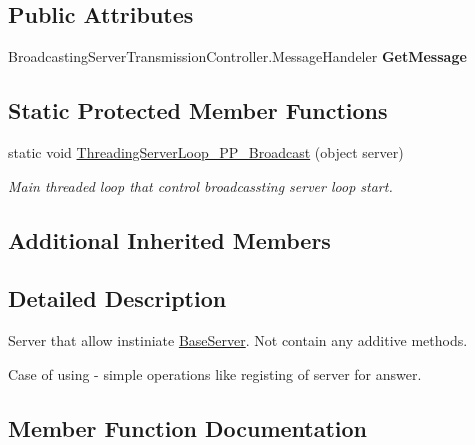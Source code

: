 \subsection*{Public Attributes}
\begin{DoxyCompactItemize}
\item 
\mbox{\label{class_uniform_server_1_1_standard_1_1_broadcasting_server_a0c09cadabd5e8c941979bc7b32185c79}} 
Broadcasting\+Server\+Transmission\+Controller.\+Message\+Handeler {\bfseries Get\+Message}
\end{DoxyCompactItemize}
\subsection*{Static Protected Member Functions}
\begin{DoxyCompactItemize}
\item 
static void \mbox{\hyperlink{class_uniform_server_1_1_standard_1_1_broadcasting_server_af0b6354f992b05477ddbbead9a3b2250}{Threading\+Server\+Loop\+\_\+\+P\+P\+\_\+\+Broadcast}} (object server)
\begin{DoxyCompactList}\small\item\em Main threaded loop that control broadcassting server loop start. \end{DoxyCompactList}\end{DoxyCompactItemize}
\subsection*{Additional Inherited Members}


\subsection{Detailed Description}
Server that allow instiniate \mbox{\hyperlink{class_uniform_server_1_1_base_server}{Base\+Server}}. Not contain any additive methods. 

Case of using -\/ simple operations like registing of server for answer. 

\subsection{Member Function Documentation}
\mbox{\label{class_uniform_server_1_1_standard_1_1_broadcasting_server_a1d74214991e5cc82684f85137008e346}} 
